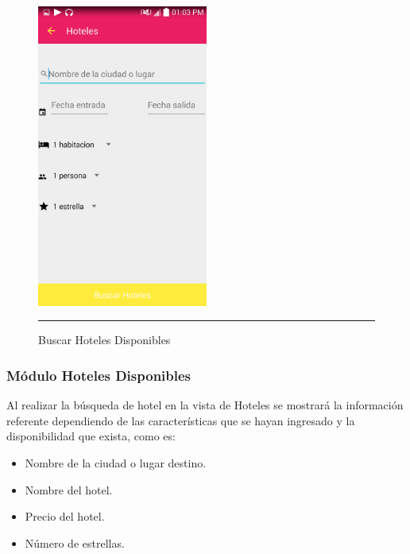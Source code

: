 \begin{figure}[h]
	\centering
		\includegraphics[width=0.5\textwidth]{Figuras/hoteles.png}
		\rule{30em}{0.5pt}
	\caption[Buscar Hoteles Disponibles]{Buscar Hoteles Disponibles}
	\label{fig:buscarHoteles}
\end{figure}
\clearpage

\subsubsection{Módulo Hoteles Disponibles}
Al realizar la búsqueda de hotel en la vista de Hoteles se mostrará la información 
referente dependiendo de las características que se hayan ingresado y la disponibilidad que exista, como es:
\begin{itemize}
\item Nombre de la ciudad o lugar destino.
\item Nombre del hotel.
\item Precio del hotel.
\item Número de estrellas.
\end{itemize}

